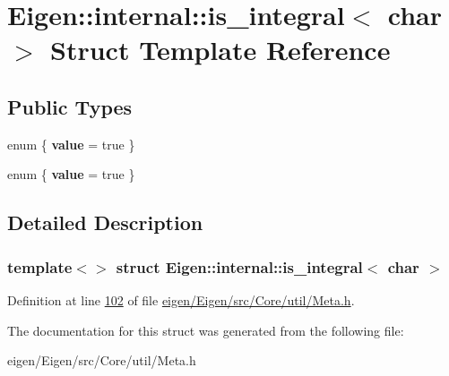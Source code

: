 \hypertarget{struct_eigen_1_1internal_1_1is__integral_3_01char_01_4}{}\section{Eigen\+:\+:internal\+:\+:is\+\_\+integral$<$ char $>$ Struct Template Reference}
\label{struct_eigen_1_1internal_1_1is__integral_3_01char_01_4}
\subsection*{Public Types}
\begin{DoxyCompactItemize}
\item 
\mbox{\label{struct_eigen_1_1internal_1_1is__integral_3_01char_01_4_a1387f51e571d4370133b3572426a0dcc}} 
enum \{ {\bfseries value} = true
 \}
\item 
\mbox{\label{struct_eigen_1_1internal_1_1is__integral_3_01char_01_4_a275ad73041ee07a58697abacf194256e}} 
enum \{ {\bfseries value} = true
 \}
\end{DoxyCompactItemize}


\subsection{Detailed Description}
\subsubsection*{template$<$$>$\newline
struct Eigen\+::internal\+::is\+\_\+integral$<$ char $>$}



Definition at line \hyperlink{eigen_2_eigen_2src_2_core_2util_2_meta_8h_source_l00102}{102} of file \hyperlink{eigen_2_eigen_2src_2_core_2util_2_meta_8h_source}{eigen/\+Eigen/src/\+Core/util/\+Meta.\+h}.



The documentation for this struct was generated from the following file\+:\begin{DoxyCompactItemize}
\item 
eigen/\+Eigen/src/\+Core/util/\+Meta.\+h\end{DoxyCompactItemize}
